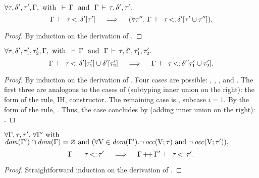 \begin{lemma}%
\label{lem:add-inner-union-right}
    $\forall \tau, \delta', \tau', \Gamma, \text{ with }
    \,\vdash\,\Gamma\ \text{ and }\ \Gamma\,\vdash\,\tau, \delta', \tau'.$
    \[
        \subtydflt{\ty}{\plug{\dctx'}{\ty'}}
        \quad\implies\quad
        (\forall \ty''.\ \subtydflt{\ty}{\plug{\dctx'}{\tyunion{\ty'}{\ty''}}}).
    \]
\end{lemma}
\begin{proof}
    By induction on the derivation of
    .
\end{proof}

\begin{lemma}%
\label{lem:sub-union-right}
    $\forall \tau, \delta', \tau'_1, \tau'_2, \Gamma, \text{ with }
    \,\vdash\,\Gamma\ \text{ and }\ \Gamma\,\vdash\,\tau, \delta', \tau'_1, \tau'_2.$
    \[
        \Gamma\;\vdash\;\tau \operatorname{<:} \delta'[\tau'_1] \cup \delta'[\tau'_2]
        \quad\implies\quad
        \Gamma\;\vdash\;\tau \operatorname{<:} \delta'[\tau'_1 \cup \tau'_2].
    \]
\end{lemma}
\begin{proof}
    By induction on the derivation of
    .
    Four cases are possible: , , , and
    . The first three are analogous to the cases of
     (subtyping inner union on the right): 
    the form of the rule, IH, constructor.
    The remaining case is , subcase $i=1$.
    By the form of the rule, .
    Thus, the case concludes by  (adding inner
    union on the right):
    .
\end{proof}

\begin{lemma}%
\label{lem:subty-weakening}
    $\forall \Gamma, \tau, \tau'.\ \forall \Gamma' \text{ with }$\\
    $\operatorname{\mathit{dom}}(\Gamma') \cap \operatorname{\mathit{dom}}(\Gamma) = \varnothing \text{ and } 
    (\forall \mathrm{V} \in \operatorname{\mathit{dom}}(\Gamma'). 
        \lnot \operatorname{\mathit{occ}}(\mathrm{V};\tau) \text{ and } \lnot \operatorname{\mathit{occ}}(\mathrm{V};\tau')),$
    \[ \Gamma\;\vdash\;\tau \operatorname{<:} \tau' \quad\implies\quad 
    \Gamma\operatorname{+\!+}\Gamma'\;\vdash\;\tau \operatorname{<:} \tau'. \]
\end{lemma}
\begin{proof}
    Straightforward induction on the derivation of .
\end{proof}

